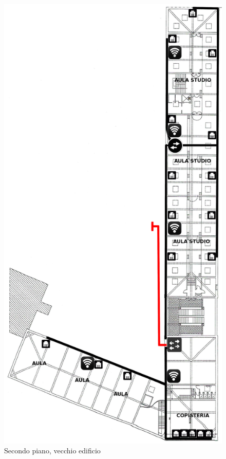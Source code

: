 \documentclass[11pt, a4paper, oneside]{article}
\begin{document}
			\begin{figure}[H]
				\caption{Secondo piano, vecchio edificio}
				\includegraphics[scale=0.2]{architecture-003.png}
			\end{figure}
		\newpage
\end{document}
